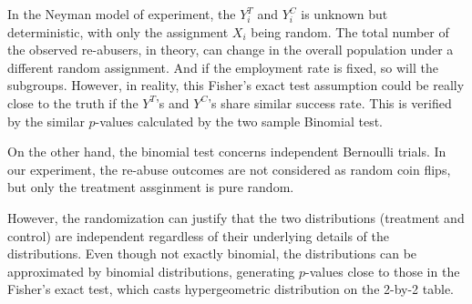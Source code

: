 \documentclass{article}\usepackage{graphicx, color}
\begin{document}
In the Neyman model of experiment, the $Y_i^T$ and $Y_i^C$ is
unknown but deterministic, with only the assignment $X_i$ being
random. The total number of the observed re-abusers, in theory, can
change in the overall population under a different random
assignment. And if the employment rate is fixed, so will the
subgroups. 
However, in reality, this Fisher's exact test assumption could
be really close to the truth if the $Y^T$'s and $Y^C$'s share similar
success rate. This is verified by the similar $p$-values calculated by
the two sample Binomial test.


On the other hand, the binomial test
concerns independent Bernoulli trials. In our experiment, the re-abuse
outcomes are not considered as random coin flips, but only the
treatment assginment is pure random. 

However, the randomization can justify that the two distributions
(treatment and control) are independent regardless of their underlying
details of the distributions. Even though not exactly binomial, the
distributions can be approximated by binomial distributions, generating
$p$-values close to those in the Fisher's exact test, which casts
hypergeometric distribution on the 2-by-2 table.
\end{document}
